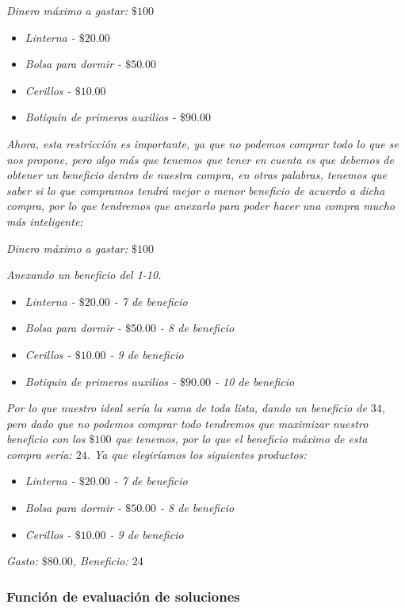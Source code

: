 \documentclass{article}
\begin{document}
\textit{Dinero máximo a gastar: $\$100$}
\begin{itemize}
	\item \textit{Linterna - $\$20.00$}
	\item \textit{Bolsa para dormir - $\$50.00$}
	\item \textit{Cerillos - $\$10.00$}
	\item \textit{Botiquin de primeros auxilios - $\$90.00$}
\end{itemize}

\textit{Ahora, esta restricción es importante, ya que no podemos comprar todo lo que se nos propone, pero algo más que tenemos que tener en cuenta es que debemos de obtener un beneficio dentro de nuestra compra, en otras palabras, tenemos que saber si lo que compramos tendrá mejor o menor beneficio de acuerdo a dicha compra, por lo que tendremos que anexarlo para poder hacer una compra mucho más inteligente:}

\textit{Dinero máximo a gastar: $\$100$}

\textit{Anexando un beneficio del 1-10.}
\begin{itemize}
	\item \textit{Linterna - $\$20.00$ - 7 de beneficio}
	\item \textit{Bolsa para dormir - $\$50.00$ - 8 de beneficio}
	\item \textit{Cerillos - $\$10.00$ - 9 de beneficio}
	\item \textit{Botiquin de primeros auxilios - $\$90.00$ - 10 de beneficio}
\end{itemize}

\textit{Por lo que nuestro ideal sería la suma de toda lista, dando un beneficio de $34$, pero dado que no podemos comprar todo tendremos que maximizar nuestro beneficio con los $\$100$ que tenemos, por lo que el beneficio máximo de esta compra sería: $24$. Ya que elegiríamos los siguientes productos:}
\begin{itemize}
	\item \textit{Linterna - $\$20.00$ - 7 de beneficio}
	\item \textit{Bolsa para dormir - $\$50.00$ - 8 de beneficio}
	\item \textit{Cerillos - $\$10.00$ - 9 de beneficio}
\end{itemize}

\textit{Gasto: $\$80.00$, Beneficio: $24$}
\subsubsection*{Función de evaluación de soluciones}
\end{document}
